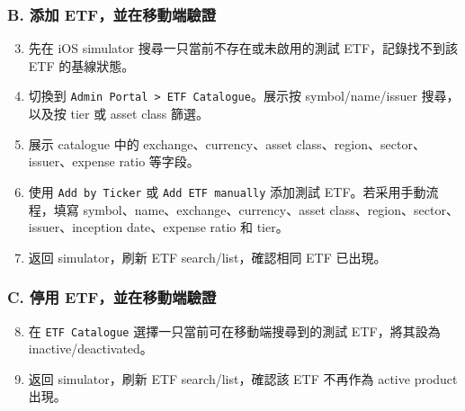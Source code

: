\subsubsection{B. 添加 ETF，並在移動端驗證}
\begin{enumerate}
\setcounter{enumi}{2}
\item 先在 iOS simulator 搜尋一只當前不存在或未啟用的測試 ETF，記錄找不到該 ETF 的基線狀態。
\item 切換到 \texttt{Admin Portal \textgreater{} ETF Catalogue}。展示按 symbol/\allowbreak{}name/\allowbreak{}issuer 搜尋，以及按 tier 或 asset class 篩選。
\item 展示 catalogue 中的 exchange、currency、asset class、region、sector、issuer、expense ratio 等字段。
\item 使用 \texttt{Add by Ticker} 或 \texttt{Add ETF manually} 添加測試 ETF。若采用手動流程，填寫 symbol、name、exchange、currency、asset class、region、sector、issuer、inception date、expense ratio 和 tier。
\item 返回 simulator，刷新 ETF search/\allowbreak{}list，確認相同 ETF 已出現。
\end{enumerate}
\subsubsection{C. 停用 ETF，並在移動端驗證}
\begin{enumerate}
\setcounter{enumi}{7}
\item 在 \texttt{ETF Catalogue} 選擇一只當前可在移動端搜尋到的測試 ETF，將其設為 inactive/\allowbreak{}deactivated。
\item 返回 simulator，刷新 ETF search/\allowbreak{}list，確認該 ETF 不再作為 active product 出現。
\end{enumerate}
